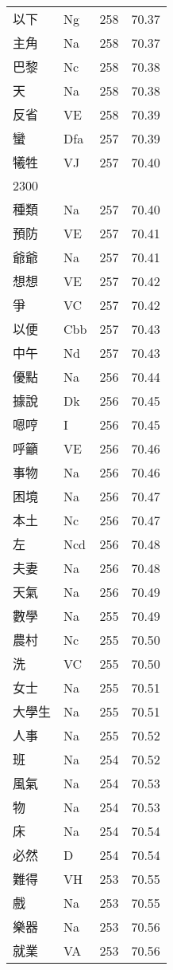 \documentclass[twocolumn]{book}
\begin{document}
\begin{supertabular}{llrr}
以下 & Ng & 258 &  70.37\\
主角 & Na & 258 &  70.37\\
巴黎 & Nc & 258 &  70.38\\
天 & Na & 258 &  70.38\\
反省 & VE & 258 &  70.39\\
蠻 & Dfa & 257 &  70.39\\
犧牲 & VJ & 257 &  70.40\\
2300\\
種類 & Na & 257 &  70.40\\
預防 & VE & 257 &  70.41\\
爺爺 & Na & 257 &  70.41\\
想想 & VE & 257 &  70.42\\
爭 & VC & 257 &  70.42\\
以便 & Cbb & 257 &  70.43\\
中午 & Nd & 257 &  70.43\\
優點 & Na & 256 &  70.44\\
據說 & Dk & 256 &  70.45\\
嗯哼 & I & 256 &  70.45\\
呼籲 & VE & 256 &  70.46\\
事物 & Na & 256 &  70.46\\
困境 & Na & 256 &  70.47\\
本土 & Nc & 256 &  70.47\\
左 & Ncd & 256 &  70.48\\
夫妻 & Na & 256 &  70.48\\
天氣 & Na & 256 &  70.49\\
數學 & Na & 255 &  70.49\\
農村 & Nc & 255 &  70.50\\
洗 & VC & 255 &  70.50\\
女士 & Na & 255 &  70.51\\
大學生 & Na & 255 &  70.51\\
人事 & Na & 255 &  70.52\\
班 & Na & 254 &  70.52\\
風氣 & Na & 254 &  70.53\\
物 & Na & 254 &  70.53\\
床 & Na & 254 &  70.54\\
必然 & D & 254 &  70.54\\
難得 & VH & 253 &  70.55\\
戲 & Na & 253 &  70.55\\
樂器 & Na & 253 &  70.56\\
就業 & VA & 253 &  70.56\\

\end{supertabular}
\end{document}
